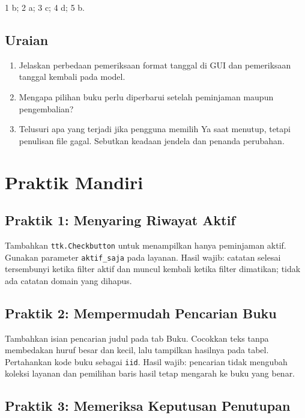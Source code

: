 \begin{info}
1 b; 2 a; 3 c; 4 d; 5 b.
\end{info}

\subsection{Uraian}

\begin{enumerate}
  \item Jelaskan perbedaan pemeriksaan format tanggal di GUI dan pemeriksaan tanggal kembali pada model.
  \item Mengapa pilihan buku perlu diperbarui setelah peminjaman maupun pengembalian?
  \item Telusuri apa yang terjadi jika pengguna memilih Ya saat menutup, tetapi penulisan file gagal. Sebutkan keadaan jendela dan penanda perubahan.
\end{enumerate}

\section{Praktik Mandiri}

\subsection{Praktik 1: Menyaring Riwayat Aktif}

Tambahkan \texttt{ttk.Checkbutton} untuk menampilkan hanya peminjaman aktif. Gunakan parameter \texttt{aktif\_saja} pada layanan. Hasil wajib: catatan selesai tersembunyi ketika filter aktif dan muncul kembali ketika filter dimatikan; tidak ada catatan domain yang dihapus.

\subsection{Praktik 2: Mempermudah Pencarian Buku}

Tambahkan isian pencarian judul pada tab Buku. Cocokkan teks tanpa membedakan huruf besar dan kecil, lalu tampilkan hasilnya pada tabel. Pertahankan kode buku sebagai \texttt{iid}. Hasil wajib: pencarian tidak mengubah koleksi layanan dan pemilihan baris hasil tetap mengarah ke buku yang benar.

\subsection{Praktik 3: Memeriksa Keputusan Penutupan}

